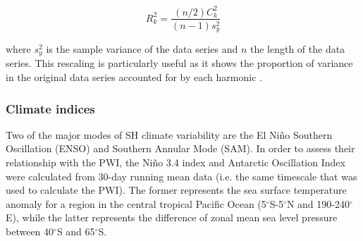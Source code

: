 \begin{equation}\label{eq:variance_explained}
R_k^2 = \frac{(n/2)C_k^2}{(n-1)s_y^2}
\end{equation}

where $s_y^2$ is the sample variance of the data series and $n$ the length of the data series. This rescaling is particularly useful as it shows the proportion of variance in the original data series accounted for by each harmonic \citep{Wilks2011}.

\subsubsection{Climate indices}
Two of the major modes of SH climate variability are the El Ni\~{n}o Southern Oscillation (ENSO) and Southern Annular Mode (SAM). In order to assess their relationship with the PWI, the Ni\~{n}o 3.4 index \citep{Trenberth2001} and Antarctic Oscillation Index \citep[AOI;][]{Gong1999} were calculated from 30-day running mean data (i.e. the same timescale that was used to calculate the PWI). The former represents the sea surface temperature anomaly for a region in the central tropical Pacific Ocean (5$^{\circ}$S-5$^{\circ}$N and 190-240$^{\circ}$E), while the latter represents the difference of zonal mean sea level pressure between 40$^{\circ}$S and 65$^{\circ}$S. 

